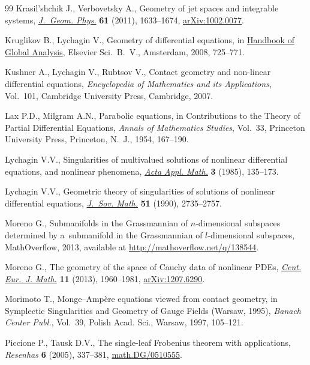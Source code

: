 \documentclass[10pt,a4paper]{amsart}
\numberwithin{equation}{section}
\begin{document}
\begin{thebibliography}{99}
Krasil'shchik J., Verbovetsky A., Geometry of jet spaces and integrable
 systems, \href{http://dx.doi.org/10.1016/j.geomphys.2010.10.012}{\textit{J.~Geom. Phys.}} \textbf{61} (2011), 1633--1674,
 \href{http://arxiv.org/abs/1002.0077}{arXiv:1002.0077}.

Kruglikov B., Lychagin V., Geometry of dif\/ferential equations, in \href{http://dx.doi.org/10.1016/B978-044452833-9.50015-2}{Handbook of
 Global Analysis}, Elsevier Sci.~B.~V., Amsterdam, 2008, 725--771.

Kushner A., Lychagin V., Rubtsov V., Contact geometry and non-linear
 dif\/ferential equations, \textit{Encyclopedia of Mathematics and its
 Applications}, Vol.~101, Cambridge University Press, Cambridge, 2007.

Lax P.D., Milgram A.N., Parabolic equations, in Contributions to the Theory of
 Partial Dif\/ferential Equations, \textit{Annals of Mathematics Studies},
 Vol.~33, Princeton University Press, Princeton, N.~J., 1954, 167--190.

Lychagin V.V., Singularities of multivalued solutions of nonlinear dif\/ferential
 equations, and nonlinear phenomena, \href{http://dx.doi.org/10.1007/BF00580702}{\textit{Acta Appl. Math.}} \textbf{3}
 (1985), 135--173.

Lychagin V.V., Geometric theory of singularities of solutions of nonlinear
 dif\/ferential equations, \href{http://dx.doi.org/10.1007/BF01095431}{\textit{J.~Sov. Math.}} \textbf{51} (1990),
 2735--2757.

Moreno G., Submanifolds in the Grassmannian of $n$-dimensional subspaces
 determined by a~sub\-ma\-ni\-fold in the Grassmannian of $l$-dimensional subspaces,
 MathOverf\/low, 2013, available at \url{http://mathoverflow.net/q/138544}.

Moreno G., The geometry of the space of {C}auchy data of nonlinear {PDE}s,
 \href{http://dx.doi.org/10.2478/s11533-013-0292-y}{\textit{Cent. Eur.~J. Math.}} \textbf{11} (2013), 1960--1981,
 \href{http://arxiv.org/abs/1207.6290}{arXiv:1207.6290}.

Morimoto T., Monge--{A}mp\`ere equations viewed from contact geometry, in
 Symplectic Singularities and Geometry of Gauge Fields ({W}arsaw, 1995),
 \textit{Banach Center Publ.}, Vol.~39, Polish Acad. Sci., Warsaw, 1997,
 105--121.

Piccione P., Tausk D.V., The single-leaf {F}robenius theorem with applications,
 \textit{Resenhas} \textbf{6} (2005), 337--381, \href{http://arxiv.org/abs/math.DG/0510555}{math.DG/0510555}.


\end{thebibliography}
\end{document}
